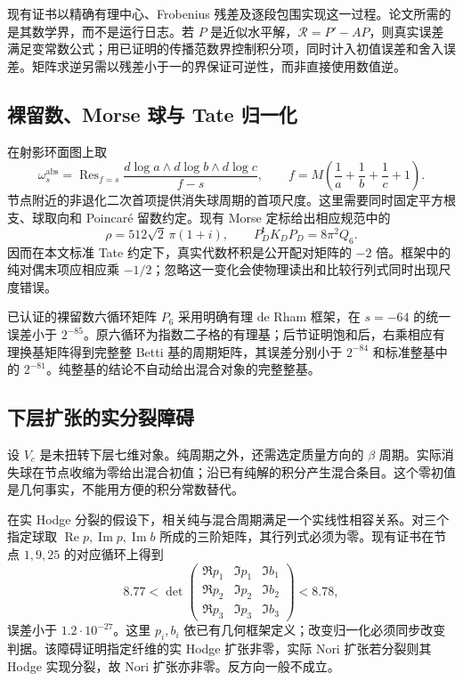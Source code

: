 \documentclass[11pt,a4paper,oneside]{ctexart}
\theoremstyle{cnplain}
\theoremstyle{definition}
\theoremstyle{remark}
\newcommand{\Res}{\operatorname{Res}}
\numberwithin{equation}{section}
\begin{document}
现有证书以精确有理中心、Frobenius 残差及逐段包围实现这一过程。论文所需的是其数学界，而不是运行日志。若 $P$ 是近似水平解，$\mathcal R=P'-AP$，则真实误差满足变常数公式；用已证明的传播范数界控制积分项，同时计入初值误差和舍入误差。矩阵求逆另需以残差小于一的界保证可逆性，而非直接使用数值逆。


\subsection{裸留数、Morse 球与 Tate 归一化}
在射影环面图上取
\begin{equation}
 \omega_s^{\mathrm{abs}}=\Res_{f=s}
 \frac{d\log a\wedge d\log b\wedge d\log c}{f-s},\qquad
 f=M\left(\frac1a+\frac1b+\frac1c+1\right).
\end{equation}
节点附近的非退化二次首项提供消失球周期的首项尺度。这里需要同时固定平方根支、球取向和 Poincaré 留数约定。现有 Morse 定标给出相应规范中的
\begin{equation}
 \rho=512\sqrt2\,\pi(1+i),\qquad
 P_D^{\mathsf t}K_DP_D=8\pi^2Q_6.
\end{equation}
因而在本文标准 Tate 约定下，真实代数杯积是公开配对矩阵的 $-2$ 倍。框架中的纯对偶末项应相应乘 $-1/2$；忽略这一变化会使物理读出和比较行列式同时出现尺度错误。

已认证的裸留数六循环矩阵 $P_6$ 采用明确有理 de Rham 框架，在 $s=-64$ 的统一误差小于 $2^{-85}$。原六循环为指数二子格的有理基；后节证明饱和后，右乘相应有理换基矩阵得到完整整 Betti 基的周期矩阵，其误差分别小于 $2^{-84}$ 和标准整基中的 $2^{-81}$。纯整基的结论不自动给出混合对象的完整整基。


\subsection{下层扩张的实分裂障碍}
设 $V_c$ 是未扭转下层七维对象。纯周期之外，还需选定质量方向的 $\beta$ 周期。实际消失球在节点收缩为零给出混合初值；沿已有纯解的积分产生混合条目。这个零初值是几何事实，不能用方便的积分常数替代。

在实 Hodge 分裂的假设下，相关纯与混合周期满足一个实线性相容关系。对三个指定球取 $\operatorname{Re}p,\operatorname{Im}p,\operatorname{Im}b$ 所成的三阶矩阵，其行列式必须为零。现有证书在节点 $1,9,25$ 的对应循环上得到
\begin{equation}
 8.77<\det\begin{pmatrix}
 \Re p_1&\Im p_1&\Im b_1\\
 \Re p_2&\Im p_2&\Im b_2\\
 \Re p_3&\Im p_3&\Im b_3
 \end{pmatrix}<8.78,
\end{equation}
误差小于 $1.2\cdot10^{-27}$。这里 $p_i,b_i$ 依已有几何框架定义；改变归一化必须同步改变判据。该障碍证明指定纤维的实 Hodge 扩张非零，实际 Nori 扩张若分裂则其 Hodge 实现分裂，故 Nori 扩张亦非零。反方向一般不成立。
\end{document}
